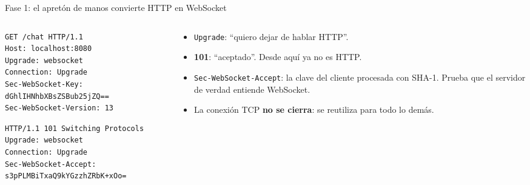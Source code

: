 \documentclass[aspectratio=169,11pt]{beamer}
\begin{document}
\begin{frame}[fragile]{Fase 1: el apretón de manos convierte HTTP en WebSocket}
  \begin{columns}[c]
    \begin{column}{0.52\textwidth}
\begin{lstlisting}[language={},title={\scriptsize\bfseries El cliente pide cambiar de protocolo}]
GET /chat HTTP/1.1
Host: localhost:8080
Upgrade: websocket
Connection: Upgrade
Sec-WebSocket-Key: dGhlIHNhbXBsZSBub25jZQ==
Sec-WebSocket-Version: 13
\end{lstlisting}
\vspace{2pt}
\begin{lstlisting}[language={},title={\scriptsize\bfseries El servidor acepta}]
HTTP/1.1 101 Switching Protocols
Upgrade: websocket
Connection: Upgrade
Sec-WebSocket-Accept: s3pPLMBiTxaQ9kYGzzhZRbK+xOo=
\end{lstlisting}
    \end{column}
    \begin{column}{0.44\textwidth}
      \begin{itemize}\small
        \item \texttt{Upgrade}: “quiero dejar de hablar HTTP”.
        \item \textbf{101}: “aceptado”. Desde aquí ya no es HTTP.
        \item \texttt{Sec-WebSocket-Accept}: la clave del cliente procesada con SHA-1. Prueba que el servidor de verdad entiende WebSocket.
        \item La conexión TCP \textbf{no se cierra}: se reutiliza para todo lo demás.
      \end{itemize}
    \end{column}
  \end{columns}
\end{frame}
\end{document}
